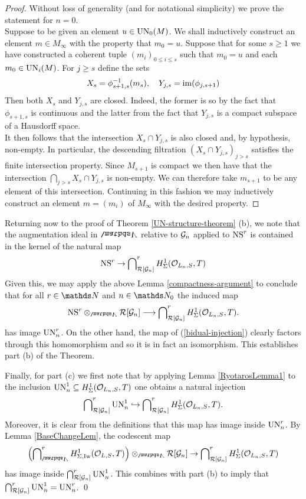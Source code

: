 \documentclass[a4paper, 
headsepline=off, DIV=12, titlepage=false]{scrartcl}
\begin{document}
\begin{proof}
    Without loss of generality (and for notational simplicity) we prove the statement for $n = 0$.\\
    Suppose to be given an element $u \in \mathrm{UN}_0(M)$. We shall inductively construct an element $m \in M_\infty$ with the property that $m_0 = u$. Suppose that for some $s \geq 1$ we have constructed a coherent tuple $(m_i)_{0 \leq i \leq s}$ such that $m_0 = u$ and each $m_0 \in \mathrm{UN}_i(M)$. For $j \geq s$ define the sets
    \begin{align*}
        X_s = \phi_{s+1,s}^{-1}(m_s), \quad Y_{j,s} = \operatorname{im}(\phi_{j,s+1})
    \end{align*}
    Then both $X_s$ and $Y_{j,s}$ are closed. Indeed, the former is so by the fact that $\phi_{s+1,s}$ is continuous and the latter from the fact that $Y_{j,s}$ is a compact subspace of a Hausdorff space.\\
    It then follows that the intersection $X_s \cap Y_{j,s}$ is also closed and, by hypothesis, non-empty. In particular, the descending filtration $(X_s \cap Y_{j,s})_{j > s}$ satisfies the finite intersection property. Since $M_{s+1}$ is compact we then have that the intersection $\bigcap_{j > s} X_s \cap Y_{j,s}$
    is non-empty. We can therefore take $m_{s+1}$ to be any element of this intersection. Continuing in this fashion we may inductively construct an element $m = (m_i)$ of $M_\infty$ with the desired property. 
\end{proof}


Returning now to the proof of Theorem \ref{UN-structure-theorem} (b), we note that the augmentation ideal in $\bLambda$ relative to $\mathcal{G}_n$ applied to $\mathrm{NS}^r$ is contained in the kernel of the natural map \begin{align*}
    \mathrm{NS}^r \to \bigcap\nolimits_{\mathcal{R}[\mathcal{G}_n]}^r H^1_\Sigma(\mathcal{O}_{L_n, S}, T)
\end{align*}
Given this, we may apply the above Lemma \ref{compactness-argument} to conclude that for all $r \in \NN$ and $n \in \N_0$ the induced map
\begin{align*}
    \NS^{r} \otimes_\bLambda \cR[\cG_n] \longrightarrow \bidual_{\cR[\cG_n]}^{r} H^1_\Sigma(\cO_{L_n, S}, T).
\end{align*}
has image $\mathrm{UN}_{n}^{r}$.
On the other hand, the map of (\ref{bidual-injection}) clearly factors through this homomorphism and so it is in fact an isomorphism. This establishes part (b) of the Theorem.

Finally, for part (c) we first note that by applying Lemma \ref{RyotarosLemma1} to the inclusion $\mathrm{UN}_n^1 \subseteq H^1_\Sigma(\mathcal{O}_{L_n,S},T)$ one obtains a natural injection 
\[
\bigcap\nolimits^r_{\mathcal{R} [\mathcal{G}_n]} \mathrm{UN}^1_n \hookrightarrow \bigcap\nolimits^r_{\mathcal{R} [\mathcal{G}_n]} H^1_\Sigma (\mathcal{O}_{L_n, S}, T).
\]
Moreover, it is clear from the definitions that this map has image inside $\mathrm{UN}^r_n$. By Lemma \ref{BaseChangeLem}, the codescent map
\[
\left ( \bidual^r_\bLambda H^1_{\Sigma, \Iw}(\cO_{L, S}, T) \right ) \otimes_\bLambda \cR [\cG_n] \to \bidual^r_{\cR [\cG_n]} H^1_\Sigma (\bigO_{L_n, S}, T)
\]
has image inside $\bigcap\nolimits^r_{\mathcal{R} [\mathcal{G}_n]} \mathrm{UN}^1_n$. This combines with part (b) to imply that $\bigcap\nolimits^r_{\mathcal{R} [\mathcal{G}_n]} \mathrm{UN}^1_n = \mathrm{UN}^r_n$. 
\qed
\end{document}
